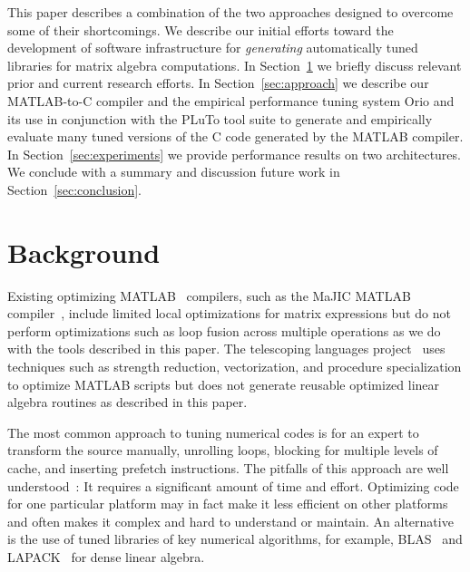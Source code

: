 \documentclass[runningheads]{llncs}
\begin{document}
This paper describes a combination of the two approaches designed to overcome
some of their shortcomings. We describe our initial efforts toward the
development of software infrastructure for \emph{generating} automatically
tuned libraries for matrix algebra computations.  In
Section~\ref{sec:background} we briefly discuss relevant prior and current
research efforts. In Section~\ref{sec:approach} we describe our
MATLAB-to-C compiler and the empirical performance
tuning system Orio and its use in conjunction with the PLuTo tool suite to
generate and empirically evaluate many tuned versions of the C code generated
by the MATLAB compiler.  In Section~\ref{sec:experiments} we provide
performance results on two architectures. We conclude with a summary and
discussion future work in Section~\ref{sec:conclusion}.

\section{Background}
\label{sec:background}

Existing optimizing MATLAB~\cite{matlab:webpage} compilers, such as the MaJIC
MATLAB compiler~\cite{MaJIC}, include limited local optimizations for matrix
expressions but do not perform optimizations such as loop fusion across
multiple operations as we do with the tools described in this paper. The
telescoping languages
project~\cite{telescopingurl} uses techniques such as
strength reduction, vectorization, and procedure specialization to optimize
MATLAB scripts but does not generate reusable optimized linear algebra
routines as described in this paper.

The most common approach to tuning numerical codes is for an expert to
transform the source manually, unrolling loops, blocking for multiple levels
of cache, and inserting prefetch instructions.  The pitfalls of this approach
are well understood~\cite{Goedecker01}: It requires a significant amount of
time and effort. Optimizing code for one particular platform may in fact make
it less efficient on other platforms and often makes it complex and hard to
understand or maintain.  An alternative is the use of tuned libraries of key
numerical algorithms, for example, BLAS~\cite{Dongarra:1990fk} and
LAPACK~\cite{LAPACK} for dense linear algebra.
\end{document}
